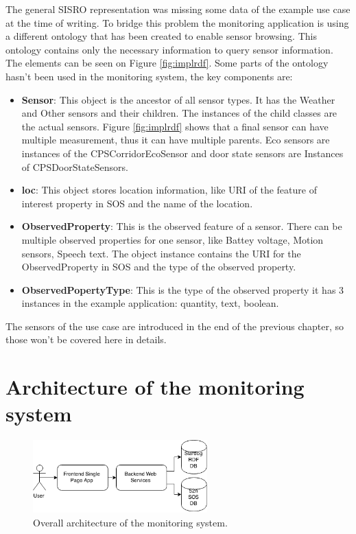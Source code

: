 The general SISRO representation was missing some data of the example use case at the time of writing. To bridge this problem the monitoring application is using a different ontology that has been created to enable sensor browsing. This ontology contains only the necessary information to query sensor information. The elements can be seen on Figure \ref{fig:implrdf}. Some parts of the ontology hasn't been used in the monitoring system, the key components are:

\begin{itemize}
\item \textbf{Sensor}: This object is the ancestor of all sensor types. It has the Weather and Other sensors and their children. The instances of the child classes are the actual sensors. Figure \ref{fig:implrdf} shows that a final sensor can have multiple measurement, thus it can have multiple parents. Eco sensors are instances of the CPSCorridorEcoSensor and door state sensors are Instances of CPSDoorStateSensors. 
\item \textbf{loc}: This object stores location information, like URI of the feature of interest property in SOS and the name of the location. 
\item \textbf{ObservedProperty}: This is the observed feature of a sensor. There can be multiple observed properties for one sensor, like Battey voltage, Motion sensors, Speech text. The object instance contains the URI for the ObservedProperty in SOS and the type of the observed property.
\item \textbf{ObservedPopertyType}: This is the type of the observed property it has 3 instances in the example application: quantity, text, boolean.
\end{itemize}
 
The sensors of the use case are introduced in the end of the previous chapter, so those won't be covered here in details.
  
\section{Architecture of the monitoring system}

\begin{figure}[h]
\centering
\includegraphics[width=0.6\textwidth]{figures/softwareArch.png}
\caption{Overall architecture of the monitoring system.\label{fig:overallarch}}
\end{figure}

